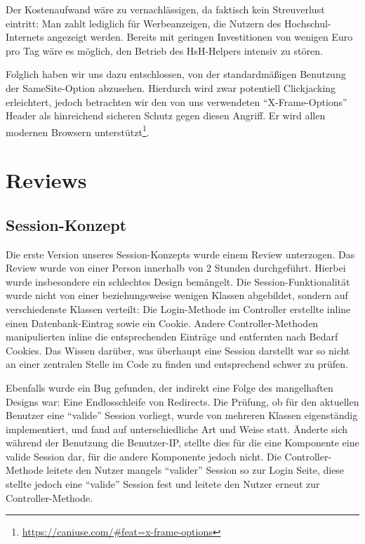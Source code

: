 \documentclass[12pt,DIV14,BCOR10mm,a4paper,parskip=half-,headsepline,headinclude,english,ngerman,bibliography=totocnumbered]{scrreprt}
\begin{document}
Der Kostenaufwand wäre zu vernachlässigen, da faktisch kein Streuverlust eintritt: Man zahlt lediglich für Werbeanzeigen, die Nutzern des Hochschul-Internets angezeigt werden. Bereits mit geringen Investitionen von wenigen Euro pro Tag wäre es möglich, den Betrieb des HsH-Helpers intensiv zu stören.

Folglich haben wir uns dazu entschlossen, von der standardmäßigen Benutzung der SameSite-Option abzusehen. Hierdurch wird zwar potentiell Clickjacking erleichtert, jedoch betrachten wir den von uns verwendeten \enquote{X-Frame-Options} Header als hinreichend sicheren Schutz gegen diesen Angriff. Er wird allen modernen Browsern unterstützt\footnote{\url{https://caniuse.com/\#feat=x-frame-options}}.	


\section{Reviews}
\subsection{Session-Konzept}
Die erste Version unseres Session-Konzepts wurde einem Review unterzogen. Das Review wurde von einer Person innerhalb von 2 Stunden durchgeführt. Hierbei wurde insbesondere ein schlechtes Design bemängelt. Die Session-Funktionalität wurde nicht von einer beziehungsweise wenigen Klassen abgebildet, sondern auf verschiedenste Klassen verteilt: Die Login-Methode im Controller erstellte inline einen Datenbank-Eintrag sowie ein Cookie. Andere Controller-Methoden manipulierten inline die entsprechenden Einträge und entfernten nach Bedarf Cookies. Das Wissen darüber, was überhaupt eine Session darstellt war so nicht an einer zentralen Stelle im Code zu finden und entsprechend schwer zu prüfen.

Ebenfalls wurde ein Bug gefunden, der indirekt eine Folge des mangelhaften Designs war: Eine Endlosschleife von Redirects. Die Prüfung, ob für den aktuellen Benutzer eine \enquote{valide} Session vorliegt, wurde von mehreren Klassen eigenständig implementiert, und fand auf unterschiedliche Art und Weise statt. Änderte sich während der Benutzung die Benutzer-IP, stellte dies für die eine Komponente eine valide Session dar, für die andere Komponente jedoch nicht. Die Controller-Methode leitete den Nutzer mangels \enquote{valider} Session so zur Login Seite, diese stellte jedoch eine \enquote{valide} Session fest und leitete den Nutzer erneut zur Controller-Methode.
\end{document}
